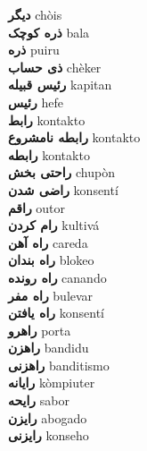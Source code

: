 \textbf{ دیگر  } chòis \\
\textbf{ ذره کوچک  } bala \\
\textbf{ ذره  } puiru \\
\textbf{ ذی حساب  } chèker \\
\textbf{ رئیس قبیله  } kapitan \\
\textbf{ رئیس  } hefe \\
\textbf{ رابط  } kontakto \\
\textbf{ رابطه نامشروع  } kontakto \\
\textbf{ رابطه  } kontakto \\
\textbf{ راحتی بخش  } chupòn \\
\textbf{ راضی شدن  } konsentí \\
\textbf{ راقم  } outor \\
\textbf{ رام کردن  } kultivá \\
\textbf{ راه آهن  } careda \\
\textbf{ راه بندان  } blokeo \\
\textbf{ راه رونده  } canando \\
\textbf{ راه مفر  } bulevar \\
\textbf{ راه یافتن  } konsentí \\
\textbf{ راهرو  } porta \\
\textbf{ راهزن  } bandidu \\
\textbf{ راهزنی  } banditismo \\
\textbf{ رایانه  } kòmpiuter \\
\textbf{ رایحه  } sabor \\
\textbf{ رایزن  } abogado \\
\textbf{ رایزنی  } konseho \\
